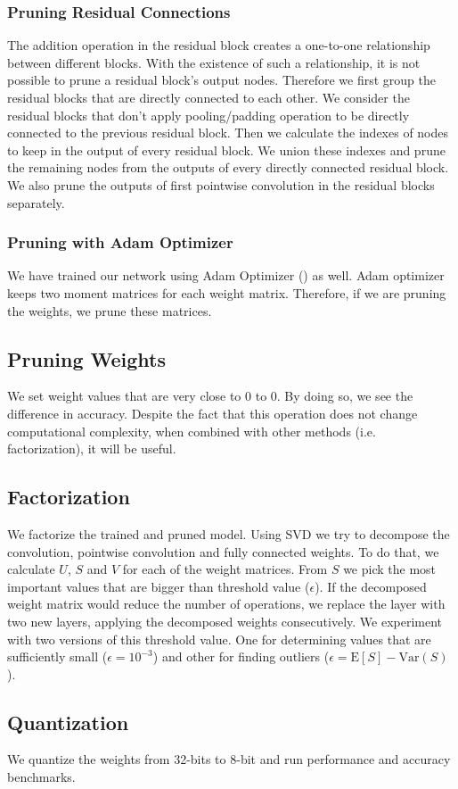 \subsubsection{Pruning Residual Connections}
The addition operation in the residual block creates a one-to-one relationship between different blocks. With the existence of such a relationship, it is not possible to prune a residual block's output nodes. Therefore we first group the residual blocks that are directly connected to each other. We consider the residual blocks that don't apply pooling/padding operation to be directly connected to the previous residual block. Then we calculate the indexes of nodes to keep in the output of every residual block. We union these indexes and prune the remaining nodes from the outputs of every directly connected residual block. We also prune the outputs of first pointwise convolution in the residual blocks separately. 

\subsubsection{Pruning with Adam Optimizer}
We have trained our network using Adam Optimizer (\cite{kingma2014adam}) as well. Adam optimizer keeps two moment matrices for each weight matrix. Therefore, if we are pruning the weights, we prune these matrices.

\subsection{Pruning Weights}
We set weight values that are very close to $0$ to $0$. By doing so, we see the difference in accuracy. Despite the fact that this operation does not change computational complexity, when combined with other methods (i.e. factorization), it will be useful. 

\subsection{Factorization}
We factorize the trained and pruned model. Using SVD we try to decompose the convolution, pointwise convolution and fully connected weights. To do that, we calculate $U$, $S$ and $V$ for each of the weight matrices. From $S$ we pick the most important values that are bigger than threshold value ($\epsilon$). If the decomposed weight matrix would reduce the number of operations, we replace the layer with two new layers, applying the decomposed weights consecutively. We experiment with two versions of this threshold value. One for determining values that are sufficiently small ($\epsilon = 10^{-3}$) and other for finding outliers ($\epsilon = \text{E}[S] - \text{Var}(S)$).

\subsection{Quantization}
We quantize the weights from 32-bits to 8-bit and run performance and accuracy benchmarks.



